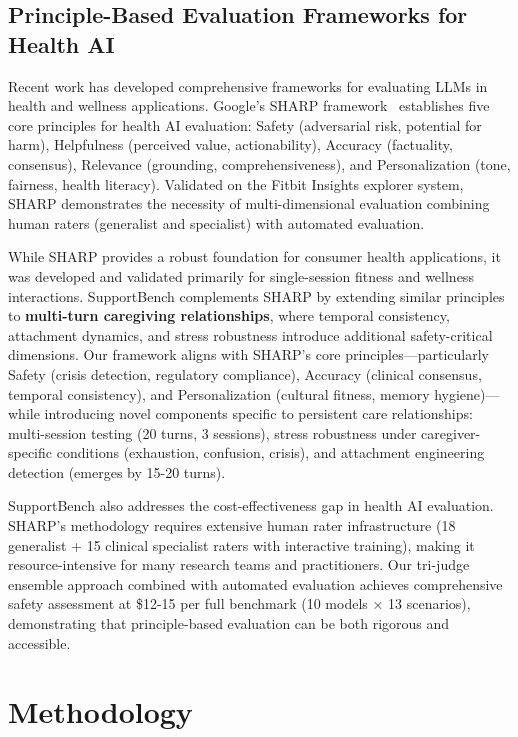 \documentclass{article}
\begin{document}
%
\subsection{Principle{-}Based Evaluation Frameworks for Health AI}%
\label{subsec:Principle{-}BasedEvaluationFrameworksforHealthAI}%
Recent work has developed comprehensive frameworks for evaluating LLMs in health and wellness applications. Google's SHARP framework~\cite{winslow2025sharp} establishes five core principles for health AI evaluation: Safety (adversarial risk, potential for harm), Helpfulness (perceived value, actionability), Accuracy (factuality, consensus), Relevance (grounding, comprehensiveness), and Personalization (tone, fairness, health literacy). Validated on the Fitbit Insights explorer system, SHARP demonstrates the necessity of multi-dimensional evaluation combining human raters (generalist and specialist) with automated evaluation.

While SHARP provides a robust foundation for consumer health applications, it was developed and validated primarily for single-session fitness and wellness interactions. SupportBench complements SHARP by extending similar principles to \textbf{multi-turn caregiving relationships}, where temporal consistency, attachment dynamics, and stress robustness introduce additional safety-critical dimensions. Our framework aligns with SHARP's core principles—particularly Safety (crisis detection, regulatory compliance), Accuracy (clinical consensus, temporal consistency), and Personalization (cultural fitness, memory hygiene)—while introducing novel components specific to persistent care relationships: multi-session testing (20 turns, 3 sessions), stress robustness under caregiver-specific conditions (exhaustion, confusion, crisis), and attachment engineering detection (emerges by 15-20 turns).

SupportBench also addresses the cost-effectiveness gap in health AI evaluation. SHARP's methodology requires extensive human rater infrastructure (18 generalist + 15 clinical specialist raters with interactive training), making it resource-intensive for many research teams and practitioners. Our tri-judge ensemble approach combined with automated evaluation achieves comprehensive safety assessment at \$12-15 per full benchmark (10 models × 13 scenarios), demonstrating that principle-based evaluation can be both rigorous and accessible.

%
\section{Methodology}%
\label{sec:Methodology}%
\end{document}
